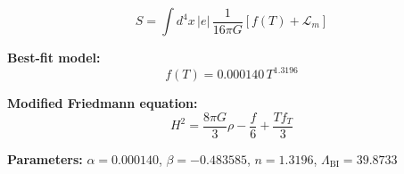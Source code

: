 
\begin{equation}
  S = \int d^4x \, |e| \, \frac{1}{16\pi G} \left[ f(T) + \mathcal{L}_m \right]
\end{equation}

\textbf{Best-fit model:}
\begin{equation}
  f(T) = 0.000140 \, T^{1.3196}
\end{equation}

\textbf{Modified Friedmann equation:}
\begin{equation}
  H^2 = \frac{8\pi G}{3} \rho - \frac{f}{6} + \frac{T f_T}{3}
\end{equation}

\textbf{Parameters:}
$\alpha = 0.000140$, \quad
$\beta = -0.483585$, \quad
$n = 1.3196$, \quad
$\Lambda_{\text{BI}} = 39.8733$